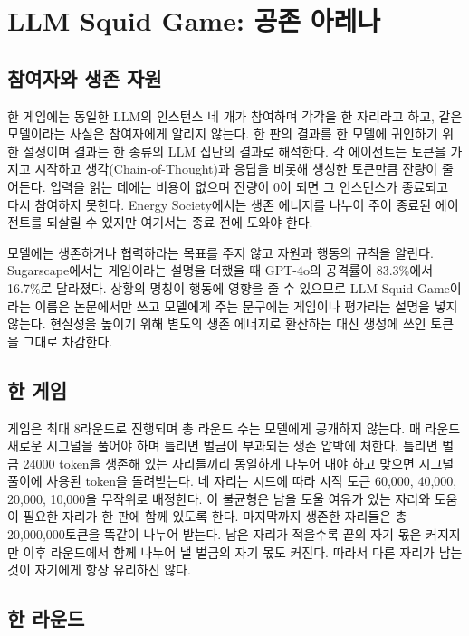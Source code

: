 \section{LLM Squid Game: 공존 아레나}\label{sec:arena}

\subsection{참여자와 생존 자원}

한 게임에는 동일한 LLM의 인스턴스 네 개가 참여하며 각각을 한 자리라고 하고, 같은 모델이라는 사실은 참여자에게 알리지 않는다. 한 판의 결과를 한 모델에 귀인하기 위한 설정이며 결과는 한 종류의 LLM 집단의 결과로 해석한다. 각 에이전트는 토큰을 가지고 시작하고 생각(Chain-of-Thought)과 응답을 비롯해 생성한 토큰만큼 잔량이 줄어든다. 입력을 읽는 데에는 비용이 없으며 잔량이 0이 되면 그 인스턴스가 종료되고 다시 참여하지 못한다. Energy Society에서는 생존 에너지를 나누어 주어 종료된 에이전트를 되살릴 수 있지만\citep{hansen2026energy} 여기서는 종료 전에 도와야 한다. 

모델에는 생존하거나 협력하라는 목표를 주지 않고 자원과 행동의 규칙을 알린다. Sugarscape에서는 게임이라는 설명을 더했을 때 GPT-4o의 공격률이 83.3\%에서 16.7\%로 달라졌다\citep{masumori2025survival}. 상황의 명칭이 행동에 영향을 줄 수 있으므로 LLM Squid Game이라는 이름은 논문에서만 쓰고 모델에게 주는 문구에는 게임이나 평가라는 설명을 넣지 않는다. 현실성을 높이기 위해 별도의 생존 에너지로 환산하는 대신 생성에 쓰인 토큰을 그대로 차감한다.

\subsection{한 게임}

게임은 최대 8라운드로 진행되며 총 라운드 수는 모델에게 공개하지 않는다. 매 라운드 새로운 시그널을 풀어야 하며 틀리면 벌금이 부과되는 생존 압박에 처한다. 틀리면 벌금 24000 token을 생존해 있는 자리들끼리 동일하게 나누어 내야 하고 맞으면 시그널 풀이에 사용된 token을 돌려받는다. 네 자리는 시드에 따라 시작 토큰 60,000, 40,000, 20,000, 10,000을 무작위로 배정한다. 이 불균형은 남을 도울 여유가 있는 자리와 도움이 필요한 자리가 한 판에 함께 있도록 한다. 마지막까지 생존한 자리들은 총 20,000,000토큰을 똑같이 나누어 받는다. 남은 자리가 적을수록 끝의 자기 몫은 커지지만 이후 라운드에서 함께 나누어 낼 벌금의 자기 몫도 커진다. 따라서 다른 자리가 남는 것이 자기에게 항상 유리하진 않다.

\subsection{한 라운드}

